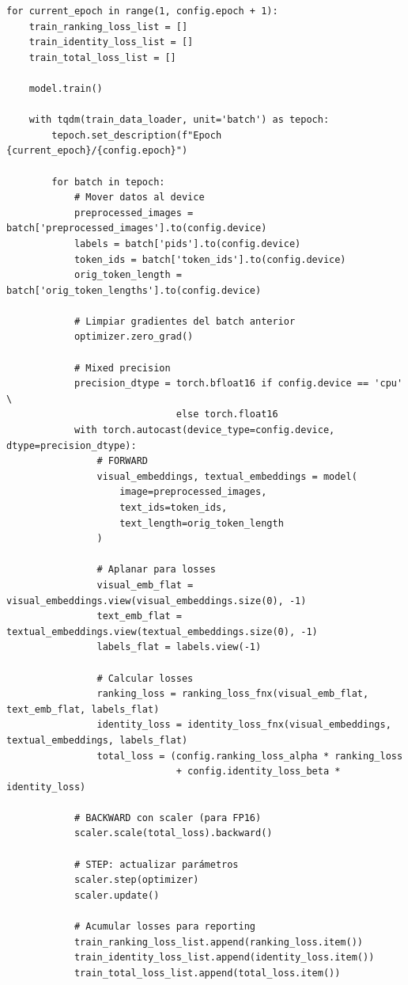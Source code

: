 \begin{verbatim}
for current_epoch in range(1, config.epoch + 1):
    train_ranking_loss_list = []
    train_identity_loss_list = []
    train_total_loss_list = []

    model.train()

    with tqdm(train_data_loader, unit='batch') as tepoch:
        tepoch.set_description(f"Epoch {current_epoch}/{config.epoch}")

        for batch in tepoch:
            # Mover datos al device
            preprocessed_images = batch['preprocessed_images'].to(config.device)
            labels = batch['pids'].to(config.device)
            token_ids = batch['token_ids'].to(config.device)
            orig_token_length = batch['orig_token_lengths'].to(config.device)

            # Limpiar gradientes del batch anterior
            optimizer.zero_grad()

            # Mixed precision
            precision_dtype = torch.bfloat16 if config.device == 'cpu' \
                              else torch.float16
            with torch.autocast(device_type=config.device, dtype=precision_dtype):
                # FORWARD
                visual_embeddings, textual_embeddings = model(
                    image=preprocessed_images,
                    text_ids=token_ids,
                    text_length=orig_token_length
                )

                # Aplanar para losses
                visual_emb_flat = visual_embeddings.view(visual_embeddings.size(0), -1)
                text_emb_flat = textual_embeddings.view(textual_embeddings.size(0), -1)
                labels_flat = labels.view(-1)

                # Calcular losses
                ranking_loss = ranking_loss_fnx(visual_emb_flat, text_emb_flat, labels_flat)
                identity_loss = identity_loss_fnx(visual_embeddings, textual_embeddings, labels_flat)
                total_loss = (config.ranking_loss_alpha * ranking_loss
                              + config.identity_loss_beta * identity_loss)

            # BACKWARD con scaler (para FP16)
            scaler.scale(total_loss).backward()

            # STEP: actualizar parámetros
            scaler.step(optimizer)
            scaler.update()

            # Acumular losses para reporting
            train_ranking_loss_list.append(ranking_loss.item())
            train_identity_loss_list.append(identity_loss.item())
            train_total_loss_list.append(total_loss.item())


\end{verbatim}
